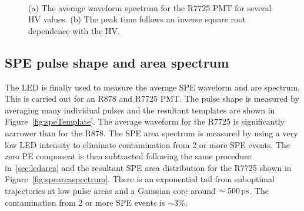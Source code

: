\documentclass[12pt]{article}
\newcommand{\unit}[1]{\ensuremath{\text{\,#1}}\xspace}
\begin{document}
\begin{figure}[ht!]
    \centering
    ~
    \caption{(a) The average waveform spectrum for the R7725 PMT for
    several HV values. (b) The peak time follows an inverse square root dependence with the HV.}
\end{figure}

\subsection{SPE pulse shape and area spectrum}

The LED is finally used to measure the average SPE waveform and 
are spectrum. This is carried out for an R878 and R7725 PMT. 
The pulse shape is measured by averaging many individual 
pulses and the resultant templates are shown in Figure~\ref{fig:speTemplate}.
The average waveform for the R7725 is significantly narrower than for the R878.
The SPE area spectrum is measured by using a very low LED intensity to eliminate
contamination from 2 or more SPE events. The zero PE component is then subtracted following
the same procedure in~\ref{sec:ledarea} and the resultant SPE area distribution for the R7725 shown in 
Figure~\ref{fig:speareaspectrum}. There is an exponential tail from suboptimal trajectories at low
pulse areas and a Gaussian core around $\sim500\unit{ps}$. The contamination from 2 or more SPE events
is $\sim 3\%$.
\end{document}
